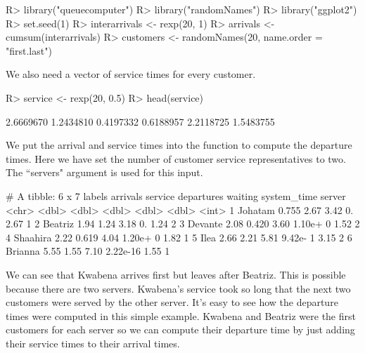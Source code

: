 \documentclass[article]{jss}
\begin{document}
\begin{CodeChunk}
\begin{Sinput}
R> library("queuecomputer")
R> library("randomNames") 
R> library("ggplot2")
R> set.seed(1) 
R> interarrivals <- rexp(20, 1)
R> arrivals <- cumsum(interarrivals)
R> customers <- randomNames(20, name.order = "first.last")
\end{Sinput}
\end{CodeChunk}

We also need a vector of service times for every customer.

\begin{CodeChunk}
\begin{Sinput}
R> service <- rexp(20, 0.5)
R> head(service)
\end{Sinput}
\begin{Soutput}
[1] 2.6669670 1.2434810 0.4197332 0.6188957 2.2118725 1.5483755
\end{Soutput}
\end{CodeChunk}

We put the arrival and service times into the  function to compute the departure times. Here we have set the number of customer service representatives to two. The ``servers" argument is used for this input. 

\begin{CodeChunk}
\begin{Soutput}
# A tibble: 6 x 7
  labels   arrivals service departures  waiting system_time server
  <chr>       <dbl>   <dbl>      <dbl>    <dbl>       <dbl>  <int>
1 Johatam     0.755   2.67        3.42 0.              2.67      1
2 Beatriz     1.94    1.24        3.18 0.              1.24      2
3 Devante     2.08    0.420       3.60 1.10e+ 0        1.52      2
4 Shaahira    2.22    0.619       4.04 1.20e+ 0        1.82      1
5 Ilea        2.66    2.21        5.81 9.42e- 1        3.15      2
6 Brianna     5.55    1.55        7.10 2.22e-16        1.55      1
\end{Soutput}
\end{CodeChunk}

We can see that Kwabena arrives first but leaves after Beatriz. This is possible because there are two servers. Kwabena's service took so long that the next two customers were served by the other server. It's easy to see how the departure times were computed in this simple example. Kwabena and Beatriz were the first customers for each server so we can compute their departure time by just adding their service times to their arrival times.
\end{document}
